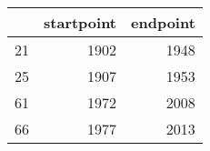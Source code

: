 % 
\begin{tabular}{rrr}
  \hline
 & startpoint & endpoint \\ 
  \hline
21 & 1902 & 1948 \\ 
  25 & 1907 & 1953 \\ 
  61 & 1972 & 2008 \\ 
  66 & 1977 & 2013 \\ 
   \hline
\end{tabular}
